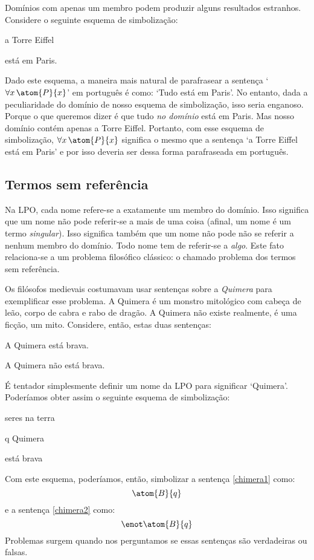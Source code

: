 Domínios com apenas um membro podem produzir alguns resultados estranhos.
Considere o seguinte esquema de simbolização:
\begin{center}
\begin{ekey}
\item[\text{domínio}] a Torre Eiffel
\item[\atom{P}{x}]  está em Paris.
\end{ekey}
\end{center}
Dado este esquema, a maneira mais natural de parafrasear a sentença `$\forall x\,\atom{P}{x}$' em português é como: `Tudo está em Paris'.
No entanto, dada a peculiaridade do domínio de nosso esquema de simbolização, isso seria enganoso.
Porque o que queremos dizer é que tudo \emph{no domínio} está em Paris.
Mas nosso domínio contém apenas a Torre Eiffel.
Portanto, com esse esquema de simbolização, $\forall x\,\atom{P}{x}$ significa o mesmo que a sentença `a Torre Eiffel está em Paris' e por isso deveria ser dessa forma parafraseada em português.


\subsection{Termos sem referência}

Na LPO, cada nome refere-se a exatamente um membro do domínio.
Isso significa que um nome não pode referir-se a mais de uma coisa (afinal, um nome é um termo \emph{singular}).
Isso significa também que um nome não pode não se referir a nenhum membro do domínio.
Todo nome tem de referir-se a \emph{algo}.
Este fato relaciona-se a um problema filosófico clássico: o chamado problema dos termos sem referência.

Os filósofos medievais costumavam usar sentenças sobre a \emph{Quimera} para exemplificar esse problema.
A Quimera é um monstro mitológico com cabeça de leão, corpo de cabra e rabo de dragão.
A Quimera não existe realmente, é uma ficção, um mito.
Considere, então, estas duas sentenças:
\begin{earg}
\item[\ex{chimera1}] A Quimera está brava.
\item[\ex{chimera2}] A Quimera não está brava.
\end{earg}
É tentador simplesmente definir um nome da LPO para significar `Quimera'.
Poderíamos obter assim o seguinte esquema de simbolização:
\begin{center}
\begin{ekey}
\item[\text{domínio}] seres na terra
\item[q] Quimera
\item[\atom{B}{x}]  está brava
\end{ekey}
\end{center}
Com este esquema, poderíamos, então, simbolizar a sentença \ref{chimera1} como:
$$\atom{B}{q}$$
e a sentença \ref{chimera2} como:
$$\enot\atom{B}{q}$$
Problemas surgem quando nos perguntamos se essas sentenças são verdadeiras ou falsas.

